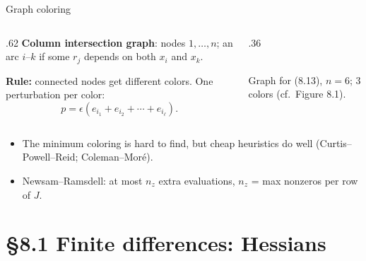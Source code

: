 \documentclass[12pt,aspectratio=169]{beamer}
\newcommand{\eps}{\epsilon}
\begin{document}
\begin{frame}{Graph coloring}
  \begin{columns}[c]
    \begin{column}{.62\textwidth}
      \textbf{Column intersection graph}: nodes $1,\dots,n$; an arc $i$--$k$ if some $r_j$ depends on both $x_i$ and $x_k$.

      \vspace{1ex}
      \textbf{Rule:} connected nodes get different colors. One perturbation per color:
      \[
        p=\eps(e_{i_1}+e_{i_2}+\cdots+e_{i_\ell}).
      \]
    \end{column}
    \begin{column}{.36\textwidth}
      \centering
      \\[1ex]
      Graph for (8.13), $n=6$; 3 colors (cf.\ Figure 8.1).
    \end{column}
  \end{columns}
  \begin{itemize}
    \item The minimum coloring is hard to find, but cheap heuristics do well
      (Curtis--Powell--Reid; Coleman--Mor\'e).
    \item Newsam--Ramsdell: at most $n_z$ extra evaluations, $n_z$ = max nonzeros per row of $J$.
  \end{itemize}
\end{frame}

\section{\S8.1 Finite differences: Hessians}
\end{document}
